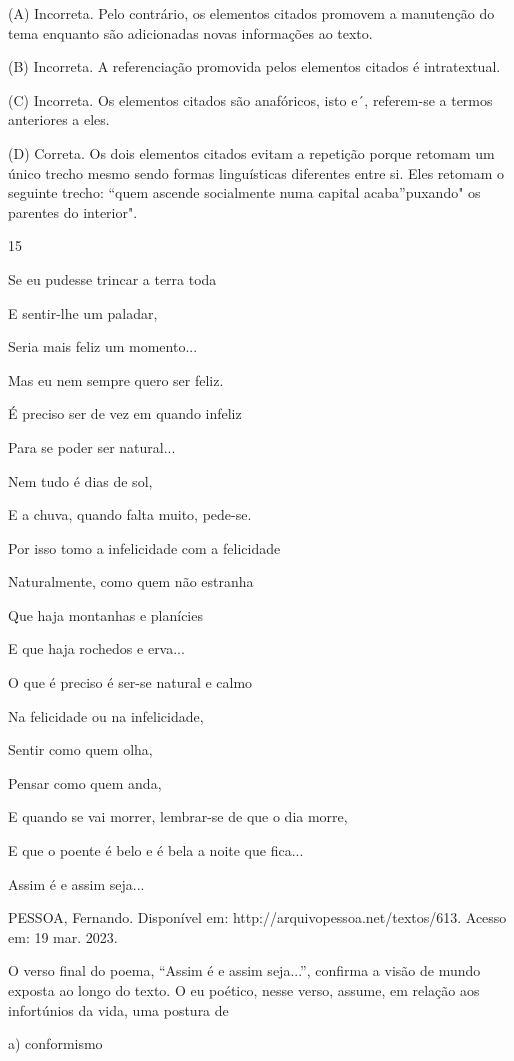 (A) Incorreta. Pelo contrário, os elementos citados promovem a
manutenção do tema enquanto são adicionadas novas informações ao texto.

(B) Incorreta. A referenciação promovida pelos elementos citados é
intratextual.

(C) Incorreta. Os elementos citados são anafóricos, isto e´, referem-se
a termos anteriores a eles.

(D) Correta. Os dois elementos citados evitam a repetição porque retomam
um único trecho mesmo sendo formas linguísticas diferentes entre si.
Eles retomam o seguinte trecho: ``quem ascende socialmente numa capital
acaba''puxando" os parentes do interior".

\num{15}

Se eu pudesse trincar a terra toda

E sentir-lhe um paladar,

Seria mais feliz um momento...

Mas eu nem sempre quero ser feliz.

É preciso ser de vez em quando infeliz

Para se poder ser natural...

Nem tudo é dias de sol,

E a chuva, quando falta muito, pede-se.

Por isso tomo a infelicidade com a felicidade

Naturalmente, como quem não estranha

Que haja montanhas e planícies

E que haja rochedos e erva...

O que é preciso é ser-se natural e calmo

Na felicidade ou na infelicidade,

Sentir como quem olha,

Pensar como quem anda,

E quando se vai morrer, lembrar-se de que o dia morre,

E que o poente é belo e é bela a noite que fica...

Assim é e assim seja...

PESSOA, Fernando. Disponível em: http://arquivopessoa.net/textos/613.
Acesso em: 19 mar. 2023.

O verso final do poema, ``Assim é e assim seja...'', confirma a visão de
mundo exposta ao longo do texto. O eu poético, nesse verso, assume, em
relação aos infortúnios da vida, uma postura de

a) conformismo

